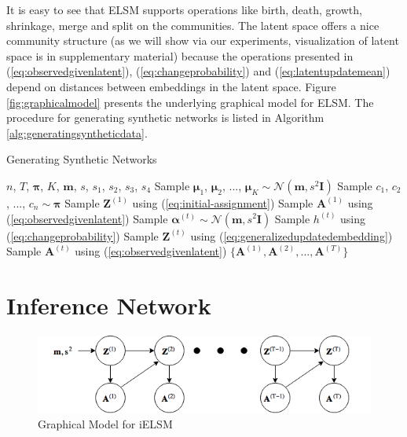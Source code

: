 \documentclass[letterpaper]{article} %
\begin{document}
It is easy to see that ELSM supports operations like birth, death, growth, shrinkage, merge and split on the communities. The latent space offers a nice community structure (as we will show via our experiments, visualization of latent space is in supplementary material) because the operations presented in (\ref{eq:observedgivenlatent}), (\ref{eq:changeprobability}) and (\ref{eq:latentupdatemean}) depend on distances between embeddings in the latent space. Figure \ref{fig:graphicalmodel} presents the underlying graphical model for ELSM. The procedure for generating synthetic networks is listed in Algorithm \ref{alg:generatingsyntheticdata}.

\begin{algorithm}[tb]
   \caption{Generating Synthetic Networks}
   \label{alg:generatingsyntheticdata}
\begin{algorithmic}
    ${n}$, ${T}$, $\mathbf{\pi}$, ${K}$, $\mathbf{m}$, ${s}$, ${s_1}$, ${s_2}$, ${s_3}$, ${s_4}$
   \STATE Sample $\bm{\mu}_1$, $\bm{\mu}_2$, ..., $\bm{\mu}_K \sim \mathcal{N}(\mathbf{m}, {s^2}\mathbf{I})$
   \STATE Sample ${c_1}$, ${c_2}$, ..., ${c_n} \sim \mathbf{\pi}$
   \STATE Sample $\mathbf{Z}^{(1)}$ using (\ref{eq:initial-assignment})
   \STATE Sample $\mathbf{A}^{(1)}$ using (\ref{eq:observedgivenlatent})
        \STATE Sample $\bm{\alpha}^{(t)} \sim \mathcal{N}(\mathbf{m}, {s^2}\mathbf{I})$
        \STATE Sample ${h^{(t)}}$ using (\ref{eq:changeprobability})
        \STATE Sample $\mathbf{Z}^{(t)}$ using (\ref{eq:generalizedupdatedembedding})
   \STATE Sample $\mathbf{A}^{(t)}$ using (\ref{eq:observedgivenlatent})
   \ENDFOR
    $\{\mathbf{A}^{(1)}, \mathbf{A}^{(2)}, ..., \mathbf{A}^{(T)}\}$
\end{algorithmic}
\end{algorithm}


\section{Inference Network}
\label{section:inferenceinlatentevolutionmodel}

\begin{figure}
\begin{center}
\centering
\includegraphics[scale=0.35]{graphicalmodelselsm}
\caption{Graphical Model for iELSM}
\label{fig:graphicalmodelsELSM}
\end{center}
\end{figure}
\end{document}
